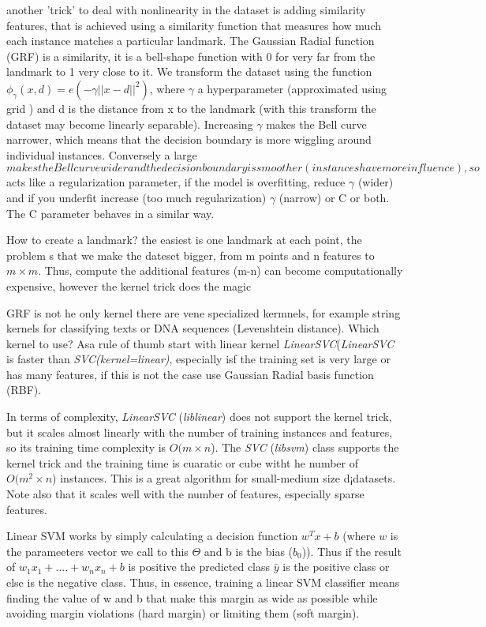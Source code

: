 \documentclass[11pt]{article}
\begin{document}
another 'trick' to deal with nonlinearity in the dataset is adding similarity features, that is achieved using a similarity function that measures how much each instance matches a particular landmark. The Gaussian Radial function (GRF) is a similarity, it is a bell-shape function with 0 for very far from the landmark to 1 very close to it. We transform the dataset using the function $\phi_{\gamma}(x,d) = e(-\gamma ||x-d||^2)$, where $\gamma$ a hyperparameter (approximated using grid ) and d is the distance from x to the landmark (with this transform the dataset may become linearly separable). Increasing $\gamma$ makes the Bell curve narrower, which means that the decision boundary is more wiggling around individual instances. Conversely a large $$ makes the Bell curve wider and the decision boundary is smoother (instances have more influence), so $$ acts like a regularization parameter, if the model is overfitting, reduce $\gamma$ (wider) and if you underfit increase (too much regularization) $\gamma$ (narrow) or C or both. The C parameter behaves in a similar way.

How to create a landmark? the easiest is one landmark at each point, the problem s that we make the dateset bigger, from m points and n features to $m \times m$. Thus, compute the additional features (m-n) can become computationally expensive, however the kernel trick does the magic 

GRF is not he only kernel there are vene specialized kermnels, for example  string kernels for classifying texts or DNA sequences (Levenshtein distance). Which kernel to use? Asa rule of thumb start with linear kernel \emph{LinearSVC}(\emph{LinearSVC} is faster than \emph{SVC(kernel=linear)}, especially isf the training set is very large or has many features, if this is not the case use Gaussian Radial basis function (RBF).

In terms of complexity, \emph{LinearSVC} (\emph{liblinear}) does not support the kernel trick, but it scales almost linearly with the number of training instances and features, so its training time complexity is $O(m \times n$).
The \emph{SVC} (\emph{libsvm}) class supports the kernel trick and the training time is cuaratic or cube witht he number of  $O(m^{2} \times n$) instances. This is a great algorithm for small-medium size d¡datasets. Note also that it scales well with the number of features, especially sparse features. 

Linear SVM works by simply calculating a decision function $w^Tx +b $ (where $w$ is the parameeters vector we call to this $\Theta$ and b is the bias ($b_0$)). Thus if the result of $w_{1} x_{1} + ....+ w_{n}x_{n} + b$ is positive the predicted class $\hat{y}$ is the positive class or else is the negative class. Thus, in essence, training a linear SVM classifier means finding the value of w and b that make this margin as wide as possible while avoiding margin violations (hard margin) or limiting them (soft margin).
\end{document}

